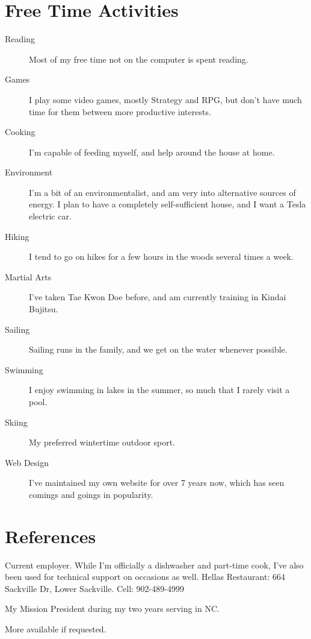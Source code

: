 \documentclass[letterpaper]{resume}
\begin{document}
\section{Free Time Activities}
	\begin{description}
		\item[Reading] Most of my free time not on the computer is spent reading.
		\item[Games] I play some video games, mostly Strategy and RPG, but don't have much time for them between more productive interests.
		\item[Cooking] I'm capable of feeding myself, and help around the house at home.
		\item[Environment] I'm a bit of an environmentalist, and am very into alternative sources of energy. I plan to have a completely self-sufficient house, and I want a Tesla electric car.
		\item[Hiking] I tend to go on hikes for a few hours in the woods several times a week.
		\item[Martial Arts] I've taken Tae Kwon Doe before, and am currently training in Kindai Bujitsu.
		\item[Sailing] Sailing runs in the family, and we get on the water whenever possible.
		\item[Swimming] I enjoy swimming in lakes in the summer, so much that I rarely visit a pool.
		\item[Skiing] My preferred wintertime outdoor sport.
		\item[Web Design] I've maintained my own website for over 7 years now, which has seen comings and goings in popularity.
	\end{description}


\newpage
\section{References}
\begin{description}
	\item Current employer. While I'm officially a dishwasher and part-time cook, I've also been used for technical support on occasions as well. Hellas Restaurant: 664 Sackville Dr, Lower Sackville. Cell: 902-489-4999
\end{description}

\begin{description}
	\item My Mission President during my two years serving in NC.
\end{description}

\begin{description}
	\item [More available if requested.]
\end{description}
\end{document}
